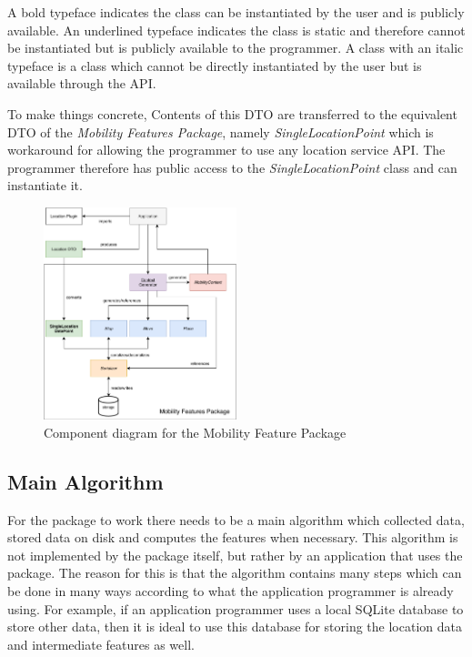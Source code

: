  A bold typeface indicates the class can be instantiated by the user and is publicly available. An underlined typeface indicates the class is static and therefore cannot be instantiated but is publicly available to the programmer. A class with an italic typeface is a class which cannot be directly instantiated by the user but is available through the API. 
 
 To make things concrete, Contents of this DTO are transferred to the equivalent DTO of the \textit{Mobility Features Package}, namely \textit{SingleLocationPoint} which is workaround for allowing the programmer to use any location service API. The programmer therefore has public access to the \textit{SingleLocationPoint} class and can instantiate it.


\begin{figure}[h]
    \centering
    \includegraphics[width=0.5\textwidth]{images/diagrams/api-diagram.pdf}
    \caption{Component diagram for the Mobility Feature Package}
    \label{fig:component-diagram}
\end{figure}










\subsection{Main Algorithm}
For the package to work there needs to be a main algorithm which collected data, stored data on disk and computes the features when necessary. This algorithm is not implemented by the package itself, but rather by an application that uses the package. The reason for this is that the algorithm contains many steps which can be done in many ways according to what the application programmer is already using. For example, if an application programmer uses a local SQLite database to store other data, then it is ideal to use this database for storing the location data and intermediate features as well.

